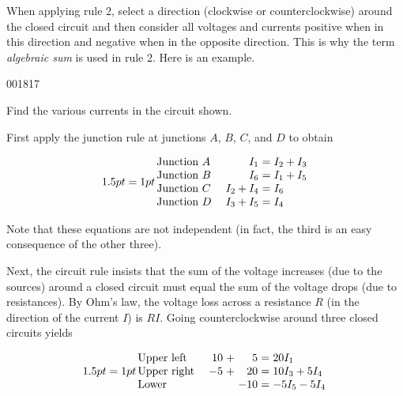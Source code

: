 \noindent When applying rule 2, select a direction (clockwise or counterclockwise) around the closed circuit and then consider all voltages and currents positive when in this direction 
and negative when in the opposite direction. This is why the term \textit{algebraic sum} is used in rule 2. Here is an example.

\begin{example}{}{001817}

Find the various currents in the circuit shown.

\begin{solution}
\begin{wrapfigure}[10]{l}{5cm}
  \vspace*{-1em}
	
\end{wrapfigure}
  First apply the junction rule at junctions $A$, $B$, $C$, and $D$ to obtain

\begin{equation*}
\arraycolsep=1pt
\begin{array}{lrcl}
	\mbox{Junction } A & I_1 & = & I_2 + I_3 \\
	\mbox{Junction } B & I_6 & = & I_1 + I_5 \\
	\mbox{Junction } C & \quad I_2 + I_4 & = & I_6 \\
	\mbox{Junction } D & I_3 + I_5 & = & I_4 \\
\end{array}
\end{equation*}

Note that these equations are not independent (in fact, the third is an easy consequence of the other three).

Next, the circuit rule insists that the sum of the voltage increases (due to the sources) around a closed circuit must equal the sum of the voltage drops (due to resistances). By Ohm's law, the voltage loss across a resistance $R$ (in the direction of the current $I$) is $RI$. Going counterclockwise around three closed circuits yields

\begin{equation*}
\arraycolsep=1pt
\begin{array}{lrrrcl}
	\mbox{Upper left} &  10 & + & 5 & = & 20I_1 \\
	\mbox{Upper right} & \quad  -5 & +& 20 & = & 10I_3 + 5I_4 \\
	\mbox{Lower} & & &-10 & = & -5I_5 - 5I_4 \\
\end{array}
\end{equation*}


\end{solution}
\end{example}
